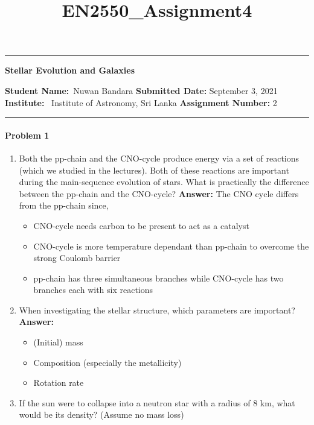 \documentclass[11pt]{scrartcl}
\title{EN2550_Assignment4}
\begin{document}
\begin{center}
	\hrule
	\vspace{.4cm}
	{\textbf { \large Stellar Evolution and Galaxies}}
\end{center}
{\textbf{Student Name:}\ Nuwan Bandara \hspace{\fill} \textbf{Submitted Date:} September 3, 2021   \\
{ \textbf{Institute:}} \ Institute of Astronomy, Sri Lanka \hspace{\fill} \textbf{Assignment Number:} 2 \\
	\hrule

\bigskip

\paragraph*{Problem 1} %
\begin{enumerate}[label=(\alph*)]
\item Both the pp-chain and the CNO-cycle produce energy via a set of reactions (which we studied in the lectures). Both of these reactions are important during the main-sequence evolution of stars. What is practically the difference between the pp-chain and the CNO-cycle?
\newline \textbf{Answer: }
\newline The CNO cycle differs from the pp-chain since,
\begin{itemize}[noitemsep,nolistsep]
    \item  CNO-cycle needs carbon to be present to act as a catalyst
    \item CNO-cycle is more temperature dependant than pp-chain to overcome the strong Coulomb barrier
    \item pp-chain has three simultaneous branches while CNO-cycle has two branches each with six reactions 
\end{itemize}
\item When investigating the stellar structure, which parameters are important?
\newline \textbf{Answer: }
\begin{itemize}[noitemsep,nolistsep]
    \item (Initial) mass
    \item Composition (especially the metallicity)
    \item Rotation rate 
\end{itemize}
\item If the sun were to collapse into a neutron star with a radius of 8 km, what would be its density? (Assume no mass loss)

\end{enumerate}}
\end{document}
